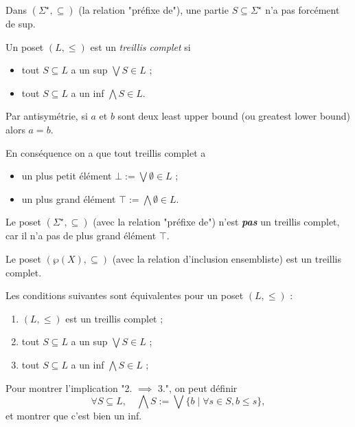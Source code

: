 \documentclass[./main]{subfiles}
\begin{document}
  \begin{exm}
    Dans $(\Sigma^\star, \subseteq)$ (la relation "préfixe de"), une partie $S \subseteq \Sigma^\star$ n'a pas forcément de sup.
  \end{exm}

  \begin{defn}
    Un poset $(L, \le)$ est un \textit{treillis complet} si
    \begin{itemize}
      \item tout $S \subseteq L$ a un sup $\bigvee S \in L$ ;
      \item tout $S \subseteq L$ a un inf $\bigwedge S \in L$.
    \end{itemize}
  \end{defn}

  \begin{rmk}
    Par antisymétrie, si $a$ et $b$ sont deux least upper bound (ou greatest lower bound) alors $a = b$.
  \end{rmk}

  En conséquence on a que tout treillis complet a 
  \begin{itemize}
    \item un plus petit élément $\bot := \bigvee \emptyset \in L$ ;
    \item un plus grand élément $\top := \bigwedge \emptyset \in L$.
  \end{itemize}

  \begin{rmk}
    Le poset $(\Sigma^\star, \subseteq)$ (avec la relation "préfixe de") n'est \textit{\textbf{pas}} un treillis complet, car il n'a pas de plus grand élément $\top$.
  \end{rmk}

  \begin{exm}
    Le poset $(\wp(X), \subseteq)$ (avec la relation d'inclusion ensembliste) est un treillis complet.
  \end{exm}

  \begin{lem}
    Les conditions suivantes sont équivalentes pour un poset $(L, \le)$ :
    \begin{enumerate}
      \item $(L, \le)$ est un treillis complet ;
      \item tout $S \subseteq L$ a un sup $\bigvee S \in L$ ;
      \item tout $S \subseteq L$ a un inf $\bigwedge S \in L$ ;
    \end{enumerate}
  \end{lem}
  \begin{prv}
    Pour montrer l'implication "2. $\implies$ 3.", on peut définir 
    \[
    \forall S \subseteq L, \quad \bigwedge S := \bigvee \{b  \mid \forall s \in S, b \le s\}
    ,\]
    et montrer que c'est bien un inf.
  \end{prv}
\end{document}
